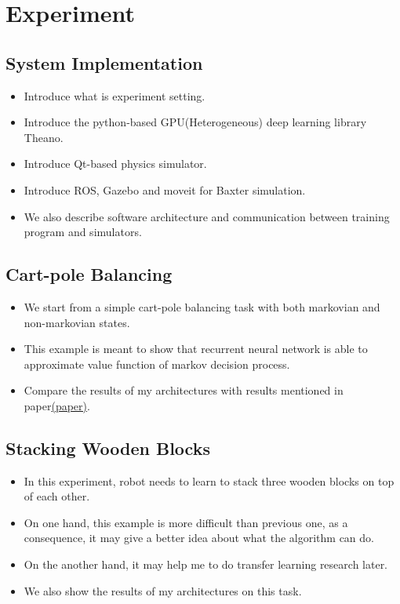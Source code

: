 \documentclass[officiallayout]{tktla}
\begin{document}
\chapter{Experiment}
\section{System Implementation}
\begin{itemize}
\item Introduce what is experiment setting.
\item Introduce the python-based GPU(Heterogeneous) deep learning library Theano.
\item Introduce Qt-based physics simulator.
\item Introduce ROS, Gazebo and moveit for Baxter simulation.
\item We also describe software architecture and communication between training program and simulators.
\end{itemize}

\section{Cart-pole Balancing}
\begin{itemize}
\item We start from a simple cart-pole balancing task with both markovian and non-markovian states.
\item This example is meant to show that recurrent neural network is able to approximate value function of markov decision process.
\item Compare the results of my architectures with results mentioned in paper\href{http://people.idsia.ch/~daan/papers/icann07.pdf}{(paper)}.
\end{itemize}

\section{Stacking Wooden Blocks}
\begin{itemize}
\item In this experiment, robot needs to learn to stack three wooden blocks on top of each other.
\item On one hand, this example is more difficult than previous one, as a consequence, it may give a better idea about what the algorithm can do.
\item On the another hand, it may help me to do transfer learning research later.
\item We also show the results of my architectures on this task.
\end{itemize}
\end{document}
